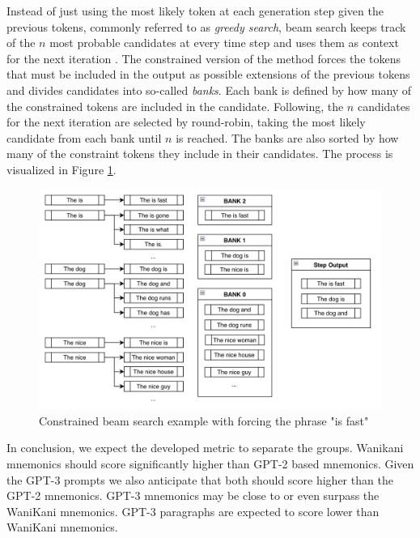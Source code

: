 Instead of just using the most likely token at each generation step given the previous tokens, commonly referred to as \emph{greedy search}, beam search keeps track of the $n$ most probable candidates at every time step and uses them as context for the next iteration \cite{kim2022guiding}. The constrained version of the method forces the tokens that must be included in the output as possible extensions of the previous tokens and divides candidates into so-called \emph{banks}. Each bank is defined by how many of the constrained tokens are included in the candidate. Following, the $n$ candidates for the next iteration are selected by round-robin, taking the most likely candidate from each bank until $n$ is reached. The banks are also sorted by how many of the constraint tokens they include in their candidates. The process is visualized in Figure \ref{figure:constrained_beam_search_example}.  
\begin{figure}
    \centering
    \includegraphics[width=400pt]{resources/cbeam_2.jpg}
    \caption{Constrained beam search example with forcing the phrase "is fast" \cite{kim2022guiding}}
    \label{figure:constrained_beam_search_example}
\end{figure}
\newline
\newline
In conclusion, we expect the developed metric to separate the groups. Wanikani mnemonics should score significantly higher than GPT-2 based mnemonics. Given the GPT-3 prompts we also anticipate that both should score higher than the GPT-2 mnemonics. GPT-3 mnemonics may be close to or even surpass the WaniKani mnemonics. GPT-3 paragraphs are expected to score lower than WaniKani mnemonics.
